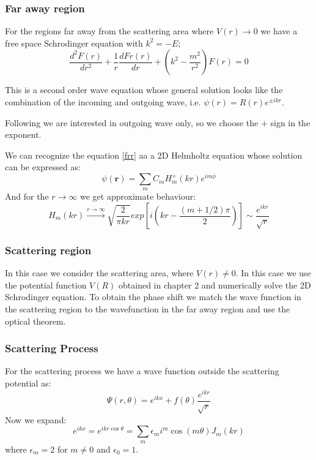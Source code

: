 \subsubsection{\textbf{Far away region}}
 For the regions far away from the scattering area where $ V(r) \rightarrow 0 $ we have a free space Schrodinger equation with $ k^2 = -E $;
\begin{equation}\label{2DS1H}
\frac{d^2 F(r)}{dr^2} + \frac{1}{r}\frac{d Fr(r)}{dr} + \left(k^2 - \frac{m^2}{r^2}\right)F(r) = 0
\end{equation}

This is a second order wave equation whose general solution looks like the combination of the incoming and outgoing wave, i.e. $ \psi(r) = R(r)e^{\pm ikr} $.

Following \cite{2DScatterLessons} we are interested in outgoing wave only, so we choose the $ + $ sign in the exponent.

We can recognize the equation \eqref{frr} aa a 2D Helmholtz equation whose solution can be expressed as:
\begin{equation}\label{2DS2H}
\psi(\mathbf{r}) = \sum_{m}{C_mH_m^+(kr)e^{im\phi}}
\end{equation}
And for the $ r \rightarrow \infty $ we get approximate behaviour:
\begin{equation}\label{2DS2}
H_m(kr) \xrightarrow{r \rightarrow \infty}\sqrt{\frac{2}{\pi k r}}exp\left[i\left(kr - \frac{(m + 1/2)\pi}{2}\right)\right] \sim \frac{e^{ikr}}{\sqrt{r}}
\end{equation}

\subsubsection{\textbf{Scattering region}}

In this case we consider the scattering area, where $ V(r) \neq 0 $. In this case we use the potential function $ V(R) $ obtained in chapter 2 and numerically solve the 2D Schrodinger equation. To obtain the phase shift we match the wave function in the scattering region to the wavefunction in the far away region and use the optical theorem.

\subsubsection{Scattering Process}

For the scattering process we have a wave function outside the scattering potential as:
\begin{equation}\label{sctPhi}
 \Psi(r,\theta) = e^{ikx} + f(\theta)\frac{e^{ikr}}{\sqrt{r}}
\end{equation}
Now we expand:
\begin{equation}\label{expE}
e^{ikx} = e^{ikr\cos\theta} = \sum_m{\epsilon_m i^m \cos(m\theta)J_m(kr)}
\end{equation}
where $\epsilon_m = 2 $ for $ m \neq 0 $ and $ \epsilon_0 = 1 $.


